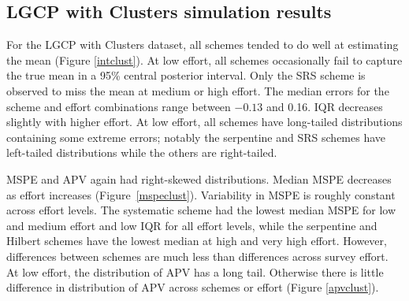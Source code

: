 \documentclass[review]{elsarticle}
\begin{document}
\subsection{LGCP with Clusters simulation results}

For the LGCP with Clusters dataset, all schemes tended to do well at
estimating the mean (Figure \ref{intclust}). At low effort, all schemes
occasionally fail to capture the true mean in a 95\% central posterior
interval. Only the SRS scheme is observed to miss the mean at medium or high
effort. The median errors for the scheme and effort combinations range
between \(-0.13\) and 0.16. IQR decreases slightly with higher effort. At low
effort, all schemes have long-tailed distributions containing some extreme
errors; notably the serpentine and SRS schemes have left-tailed distributions
while the others are right-tailed.

MSPE and APV again had right-skewed distributions. Median MSPE decreases as
effort increases (Figure~\ref{mspeclust}). Variability in MSPE is roughly
constant across effort levels. The systematic scheme had the lowest median
MSPE for low and medium effort and low IQR for all effort levels, while the
serpentine and Hilbert schemes have the lowest median at high and very high
effort. However, differences between schemes are much less than differences
across survey effort. At low effort, the distribution of APV has a long tail.
Otherwise there is little difference in distribution of APV across schemes or
effort (Figure \ref{apvclust}).
\end{document}
